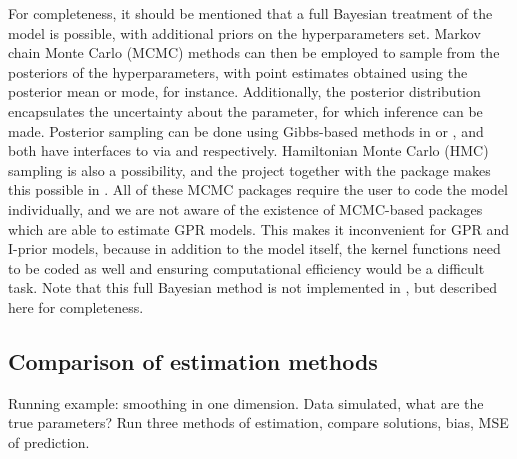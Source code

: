 For completeness, it should be mentioned that a full Bayesian treatment of the model is possible, with additional priors on the hyperparameters set.
Markov chain Monte Carlo (MCMC) methods can then be employed to sample from the posteriors of the hyperparameters, with point estimates obtained using the posterior mean or mode, for instance.
Additionally, the posterior distribution encapsulates the uncertainty about the parameter, for which inference can be made.
Posterior sampling can be done using Gibbs-based methods in  \citep{lunn2000winbugs} or  \citep{plummer2003jags}, and both have interfaces to  via  \citep{sturtz2005r2winbugs} and  \citep{denwood2016runjags} respectively.
Hamiltonian Monte Carlo (HMC) sampling is also a possibility, and the  project \citep{carpenter2016stan} together with the package  \citep{rstan}  makes this possible in .
All of these MCMC packages require the user to code the model individually, and we are not aware of the existence of MCMC-based packages which are able to estimate GPR models.
This makes it inconvenient for GPR and I-prior models, because in addition to the model itself, the kernel functions need to be coded as well and ensuring computational efficiency would be a difficult task.
Note that this full Bayesian method is not implemented in , but described here for completeness.

\subsection{Comparison of estimation methods}

Running example: smoothing in one dimension.
Data simulated, what are the true parameters?
Run three methods of estimation, compare solutions, bias, MSE of prediction.
